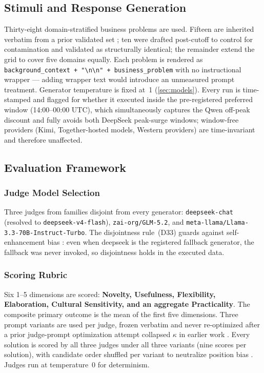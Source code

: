\documentclass[12pt,a4paper]{article}
\begin{document}
\subsection{Stimuli and Response Generation}

Thirty-eight domain-stratified business problems are used. Fifteen are inherited
verbatim from a prior validated set \citep{Hariri2025a}; ten were drafted
post-cutoff to control for contamination and validated as structurally identical;
the remainder extend the grid to cover five domains equally. Each problem is
rendered as \texttt{background\_context + "\textbackslash n\textbackslash n" +
business\_problem} with no instructional wrapper --- adding wrapper text would
introduce an unmeasured prompt treatment. Generator temperature is fixed at~1
(\cref{sec:models}). Every run is time-stamped and flagged for whether it
executed inside the pre-registered preferred window (14:00--00:00 UTC), which
simultaneously captures the Qwen off-peak discount and fully avoids both
DeepSeek peak-surge windows; window-free providers (Kimi, Together-hosted
models, Western providers) are time-invariant and therefore unaffected.

\subsection{Evaluation Framework}\label{sec:eval}

\subsubsection{Judge Model Selection}

Three judges from families disjoint from every generator: \texttt{deepseek-chat}
(resolved to \texttt{deepseek-v4-flash}), \texttt{zai-org/GLM-5.2}, and
\texttt{meta-llama/Llama-3.3-70B-Instruct-Turbo}. The disjointness rule~(D33)
guards against self-enhancement bias \citep{ZhengEtAl2023}: even when deepseek
is the registered fallback generator, the fallback was never invoked, so
disjointness holds in the executed data.

\subsubsection{Scoring Rubric}

Six 1--5 dimensions are scored: \textbf{Novelty, Usefulness, Flexibility,
Elaboration, Cultural Sensitivity, and an aggregate Practicality}. The composite
primary outcome is the mean of the first five dimensions. Three prompt variants
are used per judge, frozen verbatim and never re-optimized after a prior
judge-prompt optimization attempt collapsed $\kappa$ in earlier work
\citep{Hariri2025a}. Every solution is scored by all three judges under all
three variants (nine scores per solution), with candidate order shuffled per
variant to neutralize position bias \citep{ZhengEtAl2023}. Judges run at
temperature~0 for determinism.
\end{document}
